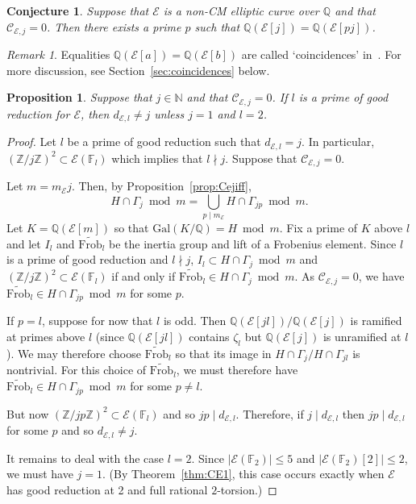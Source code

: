 \documentclass{amsart}
\theoremstyle{plain}
\newtheorem{prop}[theorem]{Proposition}
\newtheorem{conj}[theorem]{Conjecture}
\theoremstyle{remark}
\newtheorem{remark}[theorem]{Remark}
\newcommand{\F}{\mathbb{F}}
\newcommand{\N}{\mathbb{N}}
\newcommand{\Q}{\mathbb{Q}}
\newcommand{\Z}{\mathbb{Z}}
\newcommand{\E}{\mathcal{E}}
\newcommand{\Cc}{\mathcal{C}}
\newcommand{\Gal}{\mathrm{Gal}}
\newcommand{\Frob}{\mathrm{Frob}}
\begin{document}
\begin{conj}\label{conj:one-prime}
    Suppose that $\E$ is a non-CM elliptic curve over $\Q$ and that $\Cc_{\E,j} = 0$. Then there exists a prime $p$ such
    that $\Q(\E[j]) = \Q(\E[pj])$.
\end{conj}

\begin{remark}
  Equalities $\Q(\E[a]) = \Q(\E[b])$ are called `coincidences' in~\cite{DLZ}. For more discussion, see
  Section~\ref{sec:coincidences} below.
\end{remark}

\begin{prop}\label{prop:Cejzeroimplication}
  Suppose that $j \in \N$ and that $\Cc_{\E,j} = 0$. If $l$ is a prime of good reduction for $\E$, then $d_{\E,l} \ne j$
  unless $j = 1$ and $l = 2$.
\end{prop}
\begin{proof}
  Let $l$ be a prime of good reduction such that $d_{\E, l} = j$. In particular, $(\Z/j\Z)^2 \subset \E(\F_l)$ which
  implies that $l \nmid j$. Suppose that $\Cc_{\E,j} = 0$.
  
 Let $m = m_\E j$. Then, by Proposition~\ref{prop:Cejiff}, 
 \[H \cap \Gamma_j \bmod m = \bigcup_{p \mid m_\E} H \cap \Gamma_{jp} \bmod m.\] Let $K = \Q(\E[m])$ so that
 $\Gal(K/\Q) = H \bmod m$. Fix a prime of $K$ above $l$ and let $I_l$ and $\tilde{\Frob}_l$ be the inertia
 group and lift of a Frobenius element.  Since $l$ is a prime of good reduction and $l \nmid j$, $I_l \subset H \cap
 \Gamma_j\bmod m$
 and $(\Z/j\Z)^2\subset \E(\F_l)$ if and only if $\tilde{\Frob}_l \in H \cap \Gamma_j \bmod m$. As $\Cc_{\E,j} = 0$, we
 have $\tilde{\Frob}_l \in H \cap \Gamma_{jp} \bmod m$ for some $p$.

 If $p = l$, suppose for now that $l$ is odd. Then $\Q(\E[jl])/\Q(\E[j])$ is ramified at primes above $l$ (since
 $\Q(\E[jl])$ contains $\zeta_l$ but $\Q(\E[j])$ is unramified at $l$). We may therefore choose $\tilde{\Frob}_l$ so
 that its image in $H\cap \Gamma_{j}/H\cap \Gamma_{jl}$ is nontrivial. For this choice of $\tilde{\Frob}_l$, we must
 therefore have $\tilde{\Frob}_l \in H \cap \Gamma_{jp} \bmod m$ for some $p \ne l$.

 But now $(\Z/jp\Z)^2 \subset \E(\F_l)$ and so $jp \mid d_{\E, l}$. Therefore, if $j \mid d_{\E,l}$ then
 $jp \mid d_{\E,l}$ for some $p$ and so $d_{\E,l} \ne j$.

 It remains to deal with the case $l = 2$. Since $|\E(\F_2)| \le 5$ and $|\E(\F_2)[2]| \le 2$, we must have $j = 1$. (By
 Theorem~\ref{thm:CE1}, this case occurs exactly when $\E$ has good reduction at 2 and full rational $2$-torsion.)
\end{proof}
\end{document}
